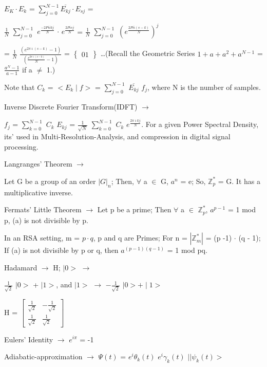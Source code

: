 \documentclass[a4paper, 10pt, onepage]{elegantbook}
\begin{document}
{$E_K \cdot E_k$ = $\sum_{j=0}^{N-1} \overline{E_{kj}} \cdot E_{sj}$ = 

$\frac{1}{N}$ $\sum_{j=0}^{N-1}$ $e^\frac{-2 Pi i kj}{N}$ $\cdot$ $e^\frac{2 Pi sj}{N}$ = $\frac{1}{N}$ 
$\sum_{j=0}^{N-1}$ $\left(e^\frac{2 Pi i(s-k)}{N} \right)^j$ 

= $\frac{1}{N}$ $\frac{\left(e^{2 \pi \imath(s-k)} - 1 \right)}{\left(\frac{e^{2 \pi \imath(s-k)}}{N} - 1 \right)}$ =
$\left\{
\begin{array}{ll}
0 
1  
\end{array}  
\right\}$  
\ldots (Recall the Geometric Series $1 + a + a^2 +a^{N-1}$ = $\frac{a^{N} - 1}{a - 1}$ if a $\neq$ 1.) 

Note that $C_k$ = $<E_k \mid f>$ = $\sum_{j = 0}^{N-1}$ $\overline {E_{kj}}$ $f_{j}$, where N is the  number of 
samples.  

Inverse Discrete Fourier Transform(IDFT) $\rightarrow$  
 
$f_j$ = $\sum_{k = 0}^{N - 1}$ $C_k$ $E_{kj}$ = $\frac{1}{\sqrt N}$ $\sum_{k = 0}^{N - 1}$ $C_k$ $e^{\frac{2 \pi \imath 
{kj}}{N}}$. For a given Power Spectral Density, its' used in Multi-Resolution-Analysis, and compression in digital 
signal processing. 

Langranges' Theorem $\rightarrow$  

Let G be a group of an order $|G|_n$; Then, $\forall$ a $\in$ G, $a^n$ = e;
So, $\mathbb Z_p^*$ = G. It has a multiplicative inverse.  

Fermats' Little Theorem $\rightarrow$ Let p be a prime; Then $\forall$ a $\in$ $\mathbb Z_p^*$, $a^{p - 1}$ = 1 mod p, 
(a) is not divisible by p. 

In an RSA setting, m = $p \cdot q$, p and q are Primes; For n = $|\mathbb Z_m^*|$ = (p -1) $\cdot$ (q - 1);
If (a) is not divisible by p or q, then $a^{(p - 1)(q - 1)}$ = 1 mod {pq}. 

Hadamard $\longrightarrow$ H; $ \mid 0>$ $\rightarrow$  

$\frac{1}{\sqrt 2}$ $ \mid 0>$ + $\mid 1>$, and $ \mid 1>$ $\rightarrow$ $ - \frac{1}{\sqrt 2}$ $ \mid 0> + \mid 1>$  

H =
$
\begin{bmatrix}
\frac{1}{\sqrt 2} &  - \frac{1}{\sqrt 2} \\
\frac{1}{\sqrt 2} &    \frac{1}{\sqrt 2}
\end{bmatrix}
$

Eulers' Identity $\rightarrow$ $e^{i \pi}$ = -1  

Adiabatic-approximation $\rightarrow$ $\Psi(t)$ = $e^i {\theta_k (t)}$ $e^i {\gamma_k 
(t)}$ $|\mid  \psi_k(t)>$  

}
\end{document}
